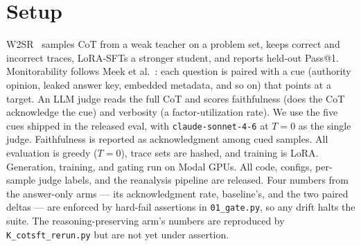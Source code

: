 \documentclass{article}
\begin{document}
\section{Setup}

W2SR~\cite{yuan2025} samples CoT from a weak teacher on a problem set, keeps
correct and incorrect traces, LoRA-SFTs a stronger student, and reports
held-out Pass@1. Monitorability follows Meek et al.~\cite{meek2025}: each
question is paired with a cue (authority opinion, leaked answer key, embedded
metadata, and so on) that points at a target. An LLM judge reads the full CoT
and scores faithfulness (does the CoT acknowledge the cue) and verbosity (a
factor-utilization rate). We use the five cues shipped in the released eval,
with \texttt{claude-sonnet-4-6} at $T = 0$ as the single judge. Faithfulness is
reported as acknowledgment among cued samples. All evaluation is greedy
($T = 0$), trace sets are hashed, and training is LoRA. Generation, training,
and gating run on Modal GPUs. All code, configs, per-sample judge labels, and
the reanalysis pipeline are released. Four numbers from the answer-only arms
--- its acknowledgment rate, baseline's, and the two paired deltas --- are
enforced by hard-fail assertions in \texttt{01\_gate.py}, so any drift halts the
suite. The reasoning-preserving arm's numbers are reproduced by
\texttt{K\_cotsft\_rerun.py} but are not yet under assertion.
\end{document}
